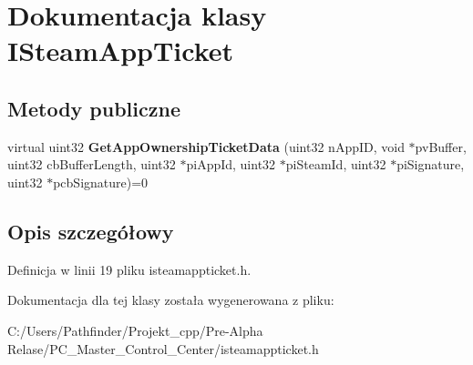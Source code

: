 \hypertarget{class_i_steam_app_ticket}{}\section{Dokumentacja klasy I\+Steam\+App\+Ticket}
\label{class_i_steam_app_ticket}
\subsection*{Metody publiczne}
\begin{DoxyCompactItemize}
\item 
\mbox{\label{class_i_steam_app_ticket_ae9a3e810afbffdf3d1a9206f48320193}} 
virtual uint32 {\bfseries Get\+App\+Ownership\+Ticket\+Data} (uint32 n\+App\+ID, void $\ast$pv\+Buffer, uint32 cb\+Buffer\+Length, uint32 $\ast$pi\+App\+Id, uint32 $\ast$pi\+Steam\+Id, uint32 $\ast$pi\+Signature, uint32 $\ast$pcb\+Signature)=0
\end{DoxyCompactItemize}


\subsection{Opis szczegółowy}


Definicja w linii 19 pliku isteamappticket.\+h.



Dokumentacja dla tej klasy została wygenerowana z pliku\+:\begin{DoxyCompactItemize}
\item 
C\+:/\+Users/\+Pathfinder/\+Projekt\+\_\+cpp/\+Pre-\/\+Alpha Relase/\+P\+C\+\_\+\+Master\+\_\+\+Control\+\_\+\+Center/isteamappticket.\+h\end{DoxyCompactItemize}
